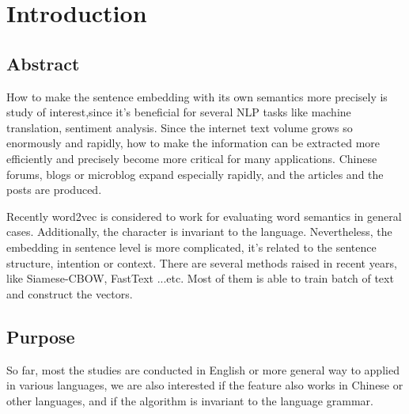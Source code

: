 \chapter{Introduction}
\setlength{\baselineskip}{1.5em}
\setlength{\parindent}{2em}
\setlength{\parskip}{1em}

\section{Abstract}

How to make the sentence embedding with its own semantics more precisely is study of interest,since it's beneficial for several NLP tasks like machine translation, sentiment analysis. Since the internet text volume grows so enormously and rapidly, how to make the information can be extracted more efficiently and precisely become more critical for many applications. Chinese forums, blogs or microblog expand especially rapidly, and the articles and the posts are produced.

Recently word2vec\cite{word2vec} is considered to work for evaluating word semantics in general cases.  Additionally, the character is invariant to the language. Nevertheless, the embedding in sentence level is more complicated, it's related to the sentence structure,  intention or context. There are several methods raised in recent years, like Siamese-CBOW, FastText ...etc. Most of them is able to train batch of text and construct the vectors.

\section{Purpose}

So far, most the studies are conducted in English or more general way to applied in various languages, we are also interested if the feature also works in Chinese or other languages, and if the algorithm is invariant to the language grammar. 
